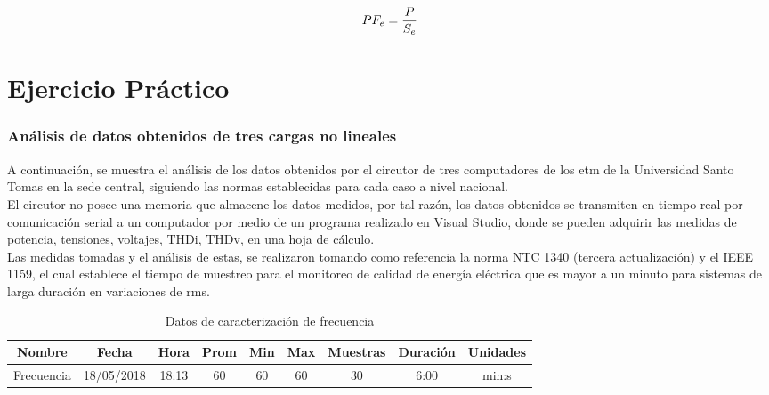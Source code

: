 \begin{equation}\label{EQ58}
PF_{e}=\frac{P}{S_{e}}\\
\end{equation}

\section{Ejercicio Práctico}

\subsubsection{Análisis de datos obtenidos de tres cargas no lineales}

A continuación, se muestra el análisis de los datos obtenidos por el circutor de tres computadores de los etm de la Universidad Santo Tomas en la sede central, siguiendo las normas establecidas para cada caso a nivel nacional. \\
El circutor no posee una memoria que almacene los datos medidos, por tal razón, los datos obtenidos se transmiten en tiempo real por comunicación serial a un computador por medio de un programa realizado en Visual Studio, donde se pueden adquirir las medidas de potencia, tensiones, voltajes, THDi, THDv, en una hoja de cálculo.\\
Las medidas tomadas y el análisis de estas, se realizaron tomando como referencia la norma NTC 1340 (tercera actualización) y el IEEE 1159, el cual establece el tiempo de muestreo para el monitoreo de calidad de energía eléctrica que es mayor a un minuto para sistemas de larga duración en variaciones de rms.

\begin{table}
\begin{center}
\begin{tabular}{ |c|c|c|c|c|c|c|c|c| } 
\hline
Nombre & Fecha & Hora & Prom & Min & Max & Muestras & Duración & Unidades\\
\hline
Frecuencia & 18/05/2018 & 18:13 & 60 & 60 & 60 & 30 & 6:00 & min:s\\
\hline
\end{tabular}
\end{center}
\caption{Datos de caracterización de frecuencia}
\label{tab:ejercicio-frecuencia}
\end{table}



